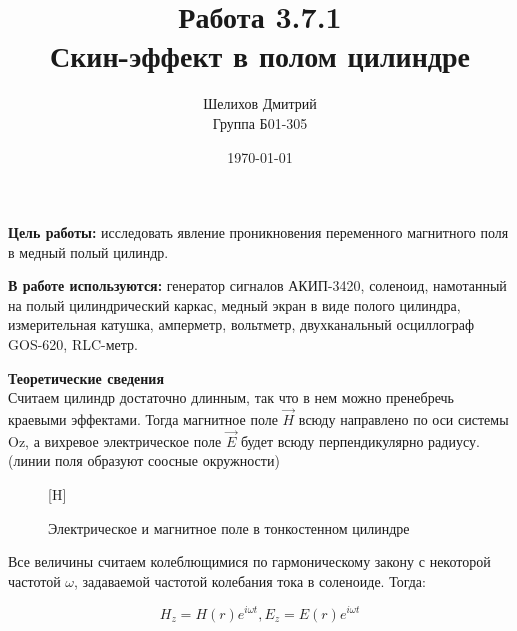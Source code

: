 \documentclass[a4paper,12pt]{article}
\author{Шелихов Дмитрий\\Группа Б01-305}
\title{\textbf{Работа 3.7.1\\Скин-эффект в полом цилиндре}}
\date{\today}
\begin{document}
 

\maketitle

\textbf{Цель работы:} исследовать явление проникновения переменного магнитного поля в медный полый цилиндр. \\
\par\textbf{В работе используются:} генератор сигналов АКИП-3420, соленоид, намотанный на полый цилиндрический каркас, медный экран в виде полого цилиндра, измерительная катушка, амперметр, вольтметр, двухканальный осциллограф GOS-620, RLC-метр. \\

\par\textbf{Теоретические сведения}\\

Считаем цилиндр достаточно длинным, так что в нем можно пренебречь краевыми эффектами. Тогда магнитное поле $\vec{H}$ всюду направлено по оси системы Oz, а вихревое электрическое поле $\vec{E}$ будет всюду перпендикулярно радиусу. (линии поля образуют соосные окружности)

\begin{figure}
[H]
\caption{Электрическое и магнитное поле в тонкостенном цилиндре}
\end{figure}

Все величины считаем колеблющимися по гармоническому закону с некоторой частотой $\omega$, задаваемой частотой колебания тока в соленоиде. Тогда: 

$$H_z = H(r)e^{i\omega t}, E_z = E(r)e^{i\omega t}$$
\end{document}
